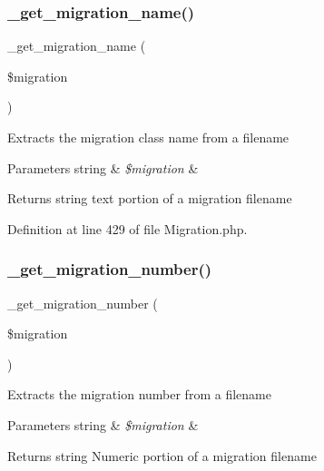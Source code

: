 \subsubsection{\texorpdfstring{\_get\_migration\_name()}{\_get\_migration\_name()}}
{\footnotesize\ttfamily \+\_\+get\+\_\+migration\+\_\+name (\begin{DoxyParamCaption}\item[{}]{\$migration }\end{DoxyParamCaption})\hspace{0.3cm}{\ttfamily [protected]}}

Extracts the migration class name from a filename


\begin{DoxyParams}[1]{Parameters}
string & {\em \$migration} & \\
\hline
\end{DoxyParams}
\begin{DoxyReturn}{Returns}
string text portion of a migration filename 
\end{DoxyReturn}


Definition at line 429 of file Migration.\+php.

\mbox{\label{class_c_i___migration_a79102ae684cc42b629c3cff885850c81}} 
\subsubsection{\texorpdfstring{\_get\_migration\_number()}{\_get\_migration\_number()}}
{\footnotesize\ttfamily \+\_\+get\+\_\+migration\+\_\+number (\begin{DoxyParamCaption}\item[{}]{\$migration }\end{DoxyParamCaption})\hspace{0.3cm}{\ttfamily [protected]}}

Extracts the migration number from a filename


\begin{DoxyParams}[1]{Parameters}
string & {\em \$migration} & \\
\hline
\end{DoxyParams}
\begin{DoxyReturn}{Returns}
string Numeric portion of a migration filename 
\end{DoxyReturn}


